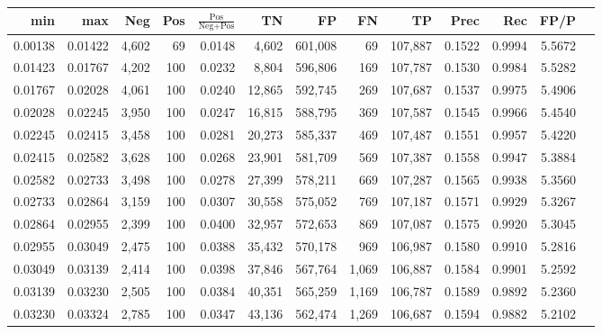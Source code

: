 \begin{tabular}{rrrrrrrrrrrrr}
\toprule
    min &     max &   Neg & Pos & $\frac{\text{Pos}}{\text{Neg}+\text{Pos}}$ &      TN &      FP &      FN &      TP &   Prec &    Rec &   FP/P \\
\midrule
0.00138 & 0.01422 & 4,602 &  69 &                                     0.0148 &   4,602 & 601,008 &      69 & 107,887 & 0.1522 & 0.9994 & 5.5672 \\
0.01423 & 0.01767 & 4,202 & 100 &                                     0.0232 &   8,804 & 596,806 &     169 & 107,787 & 0.1530 & 0.9984 & 5.5282 \\
0.01767 & 0.02028 & 4,061 & 100 &                                     0.0240 &  12,865 & 592,745 &     269 & 107,687 & 0.1537 & 0.9975 & 5.4906 \\
0.02028 & 0.02245 & 3,950 & 100 &                                     0.0247 &  16,815 & 588,795 &     369 & 107,587 & 0.1545 & 0.9966 & 5.4540 \\
0.02245 & 0.02415 & 3,458 & 100 &                                     0.0281 &  20,273 & 585,337 &     469 & 107,487 & 0.1551 & 0.9957 & 5.4220 \\
0.02415 & 0.02582 & 3,628 & 100 &                                     0.0268 &  23,901 & 581,709 &     569 & 107,387 & 0.1558 & 0.9947 & 5.3884 \\
0.02582 & 0.02733 & 3,498 & 100 &                                     0.0278 &  27,399 & 578,211 &     669 & 107,287 & 0.1565 & 0.9938 & 5.3560 \\
0.02733 & 0.02864 & 3,159 & 100 &                                     0.0307 &  30,558 & 575,052 &     769 & 107,187 & 0.1571 & 0.9929 & 5.3267 \\
0.02864 & 0.02955 & 2,399 & 100 &                                     0.0400 &  32,957 & 572,653 &     869 & 107,087 & 0.1575 & 0.9920 & 5.3045 \\
0.02955 & 0.03049 & 2,475 & 100 &                                     0.0388 &  35,432 & 570,178 &     969 & 106,987 & 0.1580 & 0.9910 & 5.2816 \\
0.03049 & 0.03139 & 2,414 & 100 &                                     0.0398 &  37,846 & 567,764 &   1,069 & 106,887 & 0.1584 & 0.9901 & 5.2592 \\
0.03139 & 0.03230 & 2,505 & 100 &                                     0.0384 &  40,351 & 565,259 &   1,169 & 106,787 & 0.1589 & 0.9892 & 5.2360 \\
0.03230 & 0.03324 & 2,785 & 100 &                                     0.0347 &  43,136 & 562,474 &   1,269 & 106,687 & 0.1594 & 0.9882 & 5.2102 \\

\end{tabular}
